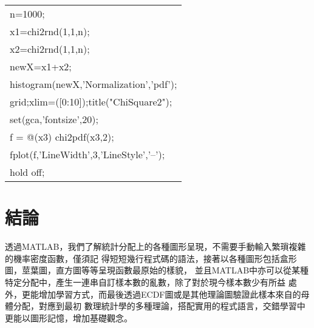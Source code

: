 \begin{enumerate}
{\begin{center}
{\begin{tabular}{p{}}
						n=1000;\\
						x1=chi2rnd(1,1,n);\\
						x2=chi2rnd(1,1,n);\\
						newX=x1+x2;\\
						histogram(newX,'Normalization','pdf');	\\
						grid;xlim=([0:10]);title("ChiSquare2");   \\
						set(gca,'fontsize',20);\\
						f = @(x3) chi2pdf(x3,2);\\
						fplot(f,'LineWidth',3,'LineStyle','--');	\\
						hold off;\\
						
					\end{tabular}
					}
				\end{center}
			}
		\end{enumerate}
	\section{結論}
		透過MATLAB，我們了解統計分配上的各種圖形呈現，不需要手動輸入繁瑣複雜的機率密度函數，僅須記			得短短幾行程式碼的語法，接著以各種圖形包括盒形圖，莖葉圖，直方圖等等呈現函數最原始的樣貌，			並且MATLAB中亦可以從某種特定分配中，產生一連串自訂樣本數的亂數，除了對於現今樣本數少有所益			處外，更能增加學習方式，而最後透過ECDF圖或是其他理論圖驗證此樣本來自的母體分配，對應到最初			數理統計學的多種理論，搭配實用的程式語言，交錯學習中更能以圖形記憶，增加基礎觀念。	
%













